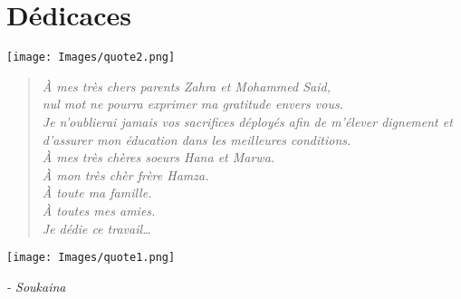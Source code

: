 \chapter*{Dédicaces}



\newcommand{\dedicationquote}[1]{%
    \begin{quote}
    \begin{center}
        \large\itshape\color{dedicationquote}
        #1
    \end{center}
    \end{quote}
}


\newcommand{\signature}[1]{%
    \begin{flushright}
        \color{signature}
        \emph{#1}
    \end{flushright}
}
\vspace{1.5cm}
\hspace{0.4cm}
\texttt{[image: Images/quote2.png]}
\hspace{5cm}
    
\dedicationquote{ À mes très chers parents Zahra et Mohammed Said, \\nul mot ne pourra exprimer ma gratitude envers vous.\\ Je n’oublierai jamais vos sacrifices déployés afin de m’élever dignement et d’assurer mon éducation dans les meilleures conditions.\\[0.5cm]
À mes très chères soeurs Hana et Marwa.\\[0.5cm]
À mon très chèr frère Hamza.\\[0.5cm]
À toute ma famille.\\[0.5cm]
À toutes mes amies.\\[0.5cm]
Je dédie ce travail…\\
}


\hspace{15cm}
\texttt{[image: Images/quote1.png]}
\vspace{1cm}
\signature{- Soukaina}

